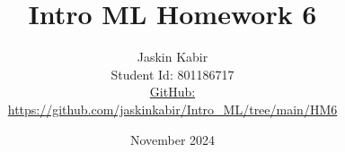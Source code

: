 \title{\Huge Intro ML Homework 6}

\author{ \huge
Jaskin Kabir \\
\Large Student Id: 801186717 \\
\Large \href{https://github.com/jaskinkabir/Intro_ML/tree/main/HM6}{GitHub:}\\\url{https://github.com/jaskinkabir/Intro_ML/tree/main/HM6}
}

\date{November 2024}

\begin{titlingpage}
\maketitle
\end{titlingpage}